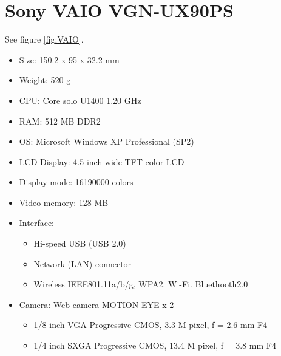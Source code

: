 \chapter{Sony VAIO VGN-UX90PS}
\label{AppendixVAIO}

See figure \ref{fig:VAIO}.

\begin{itemize}
	\item Size: 150.2 x 95 x 32.2 mm
	\item Weight: 520 g
	\item CPU: Core solo U1400 1.20 GHz
	\item RAM: 512 MB DDR2
	\item OS: Microsoft Windows XP Professional (SP2)
	\item LCD Display: 4.5 inch wide TFT color LCD
	\item Display mode: 16190000 colors
	\item Video memory: 128 MB
	\item Interface:
		\begin{itemize}
			\item Hi-speed USB (USB 2.0)
			\item Network (LAN) connector
			\item Wireless IEEE801.11a/b/g, WPA2. Wi-Fi. Bluethooth2.0
		\end{itemize}
	\item Camera: Web camera MOTION EYE x 2
		\begin{itemize}
			\item 1/8 inch VGA Progressive CMOS, 3.3 M pixel, f = 2.6 mm F4
			\item 1/4 inch SXGA Progressive CMOS, 13.4 M pixel, f = 3.8 mm F4
		\end{itemize}
\end{itemize}

